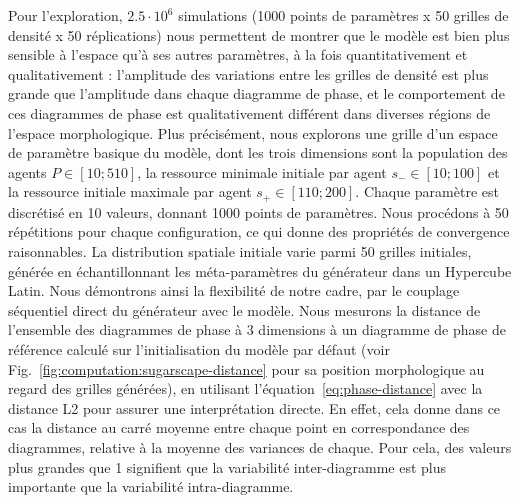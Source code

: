 {Pour l'exploration, $2.5\cdot 10^6$ simulations (1000 points de paramètres x 50 grilles de densité x 50 réplications) nous permettent de montrer que le modèle est bien plus sensible à l'espace qu'à ses autres paramètres, à la fois quantitativement et qualitativement : l'amplitude des variations entre les grilles de densité est plus grande que l'amplitude dans chaque diagramme de phase, et le comportement de ces diagrammes de phase est qualitativement différent dans diverses régions de l'espace morphologique. Plus précisément, nous explorons une grille d'un espace de paramètre basique du modèle, dont les trois dimensions sont la population des agents $P\in \left[10;510\right]$, la ressource minimale initiale par agent $s_{-}\in \left[10;100\right]$ et la ressource initiale maximale par agent $s_{+}\in \left[110;200\right]$. Chaque paramètre est discrétisé en 10 valeurs, donnant 1000 points de paramètres. Nous procédons à 50 répétitions pour chaque configuration, ce qui donne des propriétés de convergence raisonnables. La distribution spatiale initiale varie parmi 50 grilles initiales, générée en échantillonnant les méta-paramètres du générateur dans un Hypercube Latin. Nous démontrons ainsi la flexibilité de notre cadre, par le couplage séquentiel direct du générateur avec le modèle. Nous mesurons la distance de l'ensemble des diagrammes de phase à 3 dimensions à un diagramme de phase de référence calculé sur l'initialisation du modèle par défaut (voir Fig.~\ref{fig:computation:sugarscape-distance} pour sa position morphologique au regard des grilles générées), en utilisant l'équation~\ref{eq:phase-distance} avec la distance L2 pour assurer une interprétation directe. En effet, cela donne dans ce cas la distance au carré moyenne entre chaque point en correspondance des diagrammes, relative à la moyenne des variances de chaque. Pour cela, des valeurs plus grandes que 1 signifient que la variabilité inter-diagramme est plus importante que la variabilité intra-diagramme.
}




